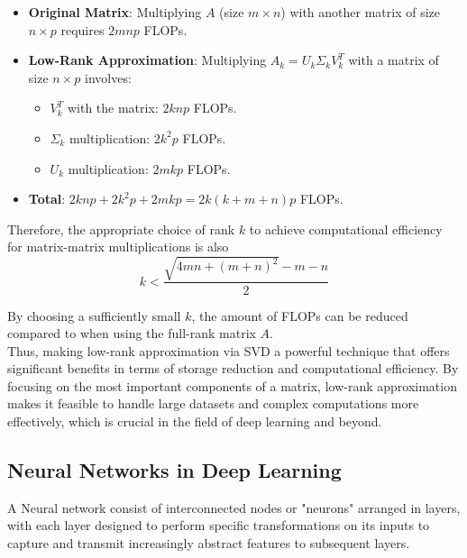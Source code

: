     \begin{itemize}
        \item \textbf{Original Matrix}: Multiplying $A$ (size $m \times n$) with another matrix of size $n \times p$ requires $2mnp$ FLOPs.
        \item \textbf{Low-Rank Approximation}: Multiplying $A_k = U_k \Sigma_k V_k^T$ with a matrix of size $n \times p$ involves:
        \begin{itemize}
            \item $V_k^T$ with the matrix: $2knp$ FLOPs.
            \item $\Sigma_k$ multiplication: $2k^2p$ FLOPs.
            \item $U_k$ multiplication: $2mkp$ FLOPs.
        \end{itemize}
        \item \textbf{Total}: $2knp + 2k^2p + 2mkp = 2k(k + m + n)p$ FLOPs.
    \end{itemize}
    Therefore, the appropriate choice of rank \(k\) to achieve computational efficiency for matrix-matrix multiplications is also
    \begin{displaymath}
        k < \frac{\sqrt{4mn + (m+n)^2} - m - n}{2}
    \end{displaymath}
    
    By choosing a sufficiently small $k$, the amount of FLOPs can be reduced compared to when using the full-rank matrix $A$.\\
    Thus, making low-rank approximation via SVD a powerful technique that offers significant benefits in terms of storage reduction and computational efficiency. By focusing on the most important components of a matrix, low-rank approximation makes it feasible to handle large datasets and complex computations more effectively, which is crucial in the field of deep learning and beyond.
    
\subsection{Neural Networks in Deep Learning}
   A Neural network consist of interconnected nodes or "neurons" arranged in layers, with each layer designed to perform specific transformations on its inputs to capture and transmit increasingly abstract features to subsequent layers.
    
